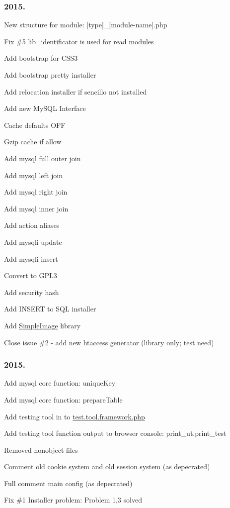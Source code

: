 \subsubsection*{2015.}


\begin{DoxyEnumerate}
\item New structure for module\-: \mbox{[}type\mbox{]}\-\_\-\mbox{[}module-\/name\mbox{]}.php
\item Fix \#5 lib\-\_\-identificator is used for read modules
\item Add bootstrap for C\-S\-S3
\item Add bootstrap pretty installer
\item Add relocation installer if sencillo not installed
\item Add new My\-S\-Q\-L Interface
\item Cache defaults O\-F\-F
\item Gzip cache if allow
\item Add mysql full outer join
\item Add mysql left join
\item Add mysql right join
\item Add mysql inner join
\item Add action aliases
\item Add mysqli update
\item Add mysqli insert
\item Convert to G\-P\-L3
\item Add security hash
\item Add I\-N\-S\-E\-R\-T to S\-Q\-L installer
\item Add \hyperlink{namespace_simple_image}{Simple\-Image} library
\item Close issue \#2 -\/ add new htaccess generator (library only; test need)
\end{DoxyEnumerate}

\subsubsection*{2015.}


\begin{DoxyEnumerate}
\item Add mysql core function\-: unique\-Key
\item Add mysql core function\-: prepare\-Table
\item Add testing tool in to \hyperlink{test_8tool_8framework_8php_source}{test.\-tool.\-framework.\-php}
\item Add testing tool function output to browser console\-: print\-\_\-ut,print\-\_\-test
\item Removed nonobject files
\item Comment old cookie system and old session system (as depecrated)
\item Full comment main config (as depecrated)
\item Fix \#1 Installer problem\-: Problem 1,3 solved
\end{DoxyEnumerate}

